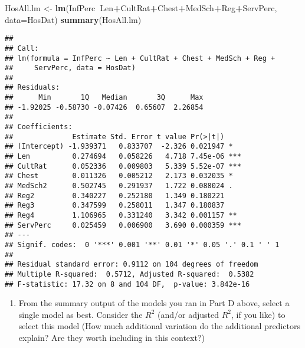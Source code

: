 \documentclass[]{article}
\newenvironment{Shaded}{\begin{snugshade}}{\end{snugshade}}
\newcommand{\KeywordTok}[1]{\textcolor[rgb]{0.13,0.29,0.53}{\textbf{#1}}}
\newcommand{\DataTypeTok}[1]{\textcolor[rgb]{0.13,0.29,0.53}{#1}}
\newcommand{\StringTok}[1]{\textcolor[rgb]{0.31,0.60,0.02}{#1}}
\newcommand{\OperatorTok}[1]{\textcolor[rgb]{0.81,0.36,0.00}{\textbf{#1}}}
\newcommand{\NormalTok}[1]{#1}
\providecommand{\tightlist}{%
  \setlength{\itemsep}{0pt}\setlength{\parskip}{0pt}}
\begin{document}
\begin{Shaded}
\begin{Highlighting}[]
\NormalTok{HosAll.lm <-}\StringTok{ }\KeywordTok{lm}\NormalTok{(InfPerc}\OperatorTok{~}\NormalTok{Len}\OperatorTok{+}\NormalTok{CultRat}\OperatorTok{+}\NormalTok{Chest}\OperatorTok{+}\NormalTok{MedSch}\OperatorTok{+}\NormalTok{Reg}\OperatorTok{+}\NormalTok{ServPerc, }\DataTypeTok{data=}\NormalTok{HosDat)}
\KeywordTok{summary}\NormalTok{(HosAll.lm)}
\end{Highlighting}
\end{Shaded}

\begin{verbatim}
## 
## Call:
## lm(formula = InfPerc ~ Len + CultRat + Chest + MedSch + Reg + 
##     ServPerc, data = HosDat)
## 
## Residuals:
##      Min       1Q   Median       3Q      Max 
## -1.92025 -0.58730 -0.07426  0.65607  2.26854 
## 
## Coefficients:
##              Estimate Std. Error t value Pr(>|t|)    
## (Intercept) -1.939371   0.833707  -2.326 0.021947 *  
## Len          0.274694   0.058226   4.718 7.45e-06 ***
## CultRat      0.052336   0.009803   5.339 5.52e-07 ***
## Chest        0.011326   0.005212   2.173 0.032035 *  
## MedSch2      0.502745   0.291937   1.722 0.088024 .  
## Reg2         0.340227   0.252180   1.349 0.180221    
## Reg3         0.347599   0.258011   1.347 0.180837    
## Reg4         1.106965   0.331240   3.342 0.001157 ** 
## ServPerc     0.025459   0.006900   3.690 0.000359 ***
## ---
## Signif. codes:  0 '***' 0.001 '**' 0.01 '*' 0.05 '.' 0.1 ' ' 1
## 
## Residual standard error: 0.9112 on 104 degrees of freedom
## Multiple R-squared:  0.5712, Adjusted R-squared:  0.5382 
## F-statistic: 17.32 on 8 and 104 DF,  p-value: 3.842e-16
\end{verbatim}

\begin{enumerate}
\def\labelenumi{\Alph{enumi})}
\setcounter{enumi}{4}
\tightlist
\item
  From the summary output of the models you ran in Part D above, select
  a single model as best. Consider the \(R^2\) (and/or adjusted \(R^2\),
  if you like) to select this model (How much additional variation do
  the additional predictors explain? Are they worth including in this
  context?)
\end{enumerate}
\end{document}
